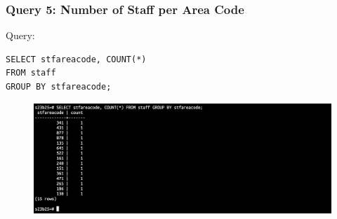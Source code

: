 \documentclass{article}
\begin{document}
\subsubsection*{Query 5: Number of Staff per Area Code}
Query:
\begin{Verbatim}[frame=single,framerule=1pt,fontfamily=courier,fontsize=\small]
SELECT stfareacode, COUNT(*) 
FROM staff 
GROUP BY stfareacode;
\end{Verbatim}
\begin{figure}[h]
    \centering
    \includegraphics[width=\textwidth]{./o_6.png}
\end{figure}
\end{document}
